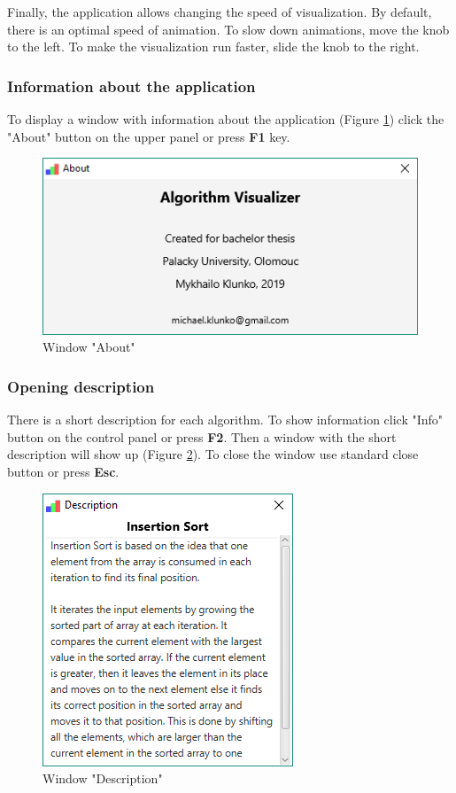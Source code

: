 \documentclass[
  field=inf,
  biblatex,
  language=english,
  glossaries,
  theorems=false,
  sourcecodes=false,
  index
]{kidiplom}
\begin{document}
Finally, the application allows changing the speed of visualization. By default, there is an optimal speed of animation. To slow down animations, move the knob to the left. To make the visualization run faster, slide the knob to the right.

\subsubsection{Information about the application}

To display a window with information about the application (Figure \ref{fig:about}) click the "About" button on the upper panel or press \textbf{F1} key.

\begin{figure}[H]
\begin{center}
	\includegraphics[scale=0.7]{img/ui/WindowAbout.PNG}
	\caption{Window "About"}\label{fig:about}
\end{center}
\end{figure}

\subsubsection{Opening description}

There is a short description for each algorithm. To show information click "Info" button on the control panel or press \textbf{F2}. Then a window with the short description will show up (Figure \ref{fig:desc}). To close the window use standard close button or press \textbf{Esc}.

\begin{figure}[H]
\begin{center}
	\includegraphics[scale=0.7]{img/ui/WindowDescription.png}
	\caption{Window "Description"}\label{fig:desc}
\end{center}
\end{figure}
\end{document}
